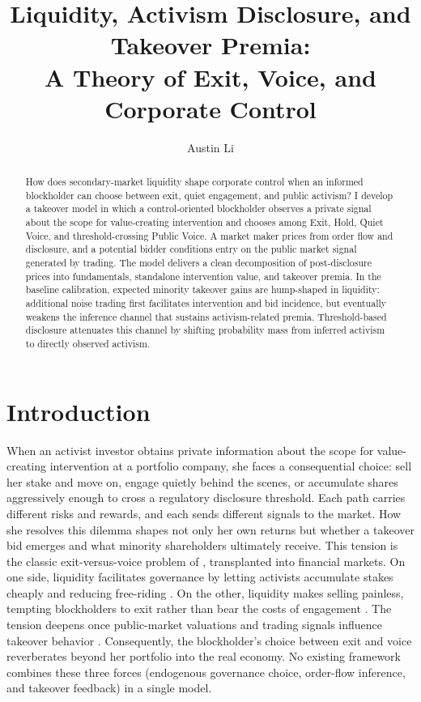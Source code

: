 \documentclass[11pt]{article}
\title{\textbf{Liquidity, Activism Disclosure, and Takeover Premia:}\\[0.3em]
\large A Theory of Exit, Voice, and Corporate Control}
\author{Austin Li\\[0.25em]}
\date{}
\newcommand{\1}{\mathbf{1}}
\begin{document}
\maketitle

\begin{abstract}
\noindent How does secondary-market liquidity shape corporate control when an informed blockholder can choose between exit, quiet engagement, and public activism? I develop a takeover model in which a control-oriented blockholder observes a private signal about the scope for value-creating intervention and chooses among Exit, Hold, Quiet Voice, and threshold-crossing Public Voice. A market maker prices from order flow and disclosure, and a potential bidder conditions entry on the public market signal generated by trading. The model delivers a clean decomposition of post-disclosure prices into fundamentals, standalone intervention value, and takeover premia. In the baseline calibration, expected minority takeover gains are hump-shaped in liquidity: additional noise trading first facilitates intervention and bid incidence, but eventually weakens the inference channel that sustains activism-related premia. Threshold-based disclosure attenuates this channel by shifting probability mass from inferred activism to directly observed activism.
\end{abstract}

\newpage

\section{Introduction}

When an activist investor obtains private information about the scope for value-creating intervention at a portfolio company, she faces a consequential choice: sell her stake and move on, engage quietly behind the scenes, or accumulate shares aggressively enough to cross a regulatory disclosure threshold. Each path carries different risks and rewards, and each sends different signals to the market. How she resolves this dilemma shapes not only her own returns but whether a takeover bid emerges and what minority shareholders ultimately receive. This tension is the classic exit-versus-voice problem of \citet{Hirschman1970}, transplanted into financial markets. On one side, liquidity facilitates governance by letting activists accumulate stakes cheaply and reducing free-riding \citep{Maug1998}. On the other, liquidity makes selling painless, tempting blockholders to exit rather than bear the costs of engagement \citep{Coffee1991,Bhide1993}. The tension deepens once public-market valuations and trading signals influence takeover behavior \citep{BondEdmansGoldstein2012,EdmansGoldsteinJiang2012}. Consequently, the blockholder's choice between exit and voice reverberates beyond her portfolio into the real economy. No existing framework combines these three forces (endogenous governance choice, order-flow inference, and takeover feedback) in a single model.
\end{document}

